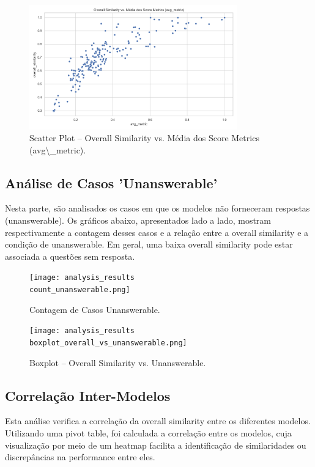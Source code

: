 \documentclass{article}%
\begin{document}
\begin{figure}[H]%
\centering%
\includegraphics[width=0.8\textwidth]{analysis_results/scatter_overall_vs_avg_metric.png}%
\caption{Scatter Plot – Overall Similarity vs. Média dos Score Metrics (avg\textbackslash{}\_metric).}%
\end{figure}

%
\subsection*{Análise de Casos 'Unanswerable'}%
\label{subsec:AnlisedeCasosUnanswerable}%
Nesta parte, são analisados os casos em que os modelos não forneceram respostas (unanswerable). Os gráficos abaixo, apresentados lado a lado, mostram respectivamente a contagem desses casos e a relação entre a overall similarity e a condição de unanswerable. Em geral, uma baixa overall similarity pode estar associada a questões sem resposta.%


\begin{figure}[H]%
\begin{minipage}[b]{0.45\textwidth}%
\centering%
\texttt{[image: analysis\_results\\count\_unanswerable.png]}%
\caption*{Contagem de Casos Unanswerable.}%
\end{minipage}\hfill%
\begin{minipage}[b]{0.45\textwidth}%
\centering%
\texttt{[image: analysis\_results\\boxplot\_overall\_vs\_unanswerable.png]}%
\caption*{Boxplot – Overall Similarity vs. Unanswerable.}%
\end{minipage}%
\end{figure}

%
\subsection*{Correlação Inter{-}Modelos}%
\label{subsec:CorrelaoInter{-}Modelos}%
Esta análise verifica a correlação da overall similarity entre os diferentes modelos. Utilizando uma pivot table, foi calculada a correlação entre os modelos, cuja visualização por meio de um heatmap facilita a identificação de similaridades ou discrepâncias na performance entre eles.%
\end{document}
